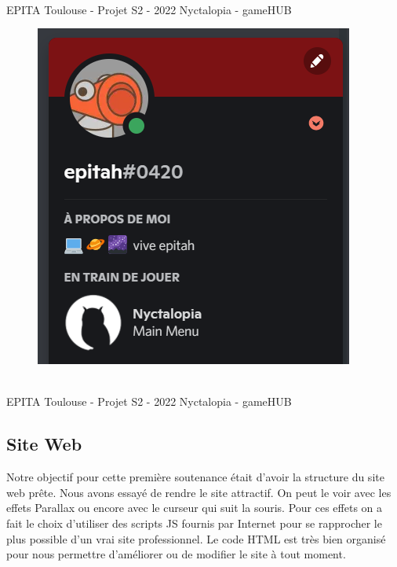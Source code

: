 \vfill
\noindent\makebox[\linewidth]{\rule{.8\paperwidth}{.6pt}}\\[0.2cm]
EPITA Toulouse - Projet S2 - 2022 \hfill Nyctalopia - gameHUB
\noindent\makebox[\linewidth]{\rule{.8\paperwidth}{.6pt}}
\newpage

\begin{figure}[H]
\centering
\begin{minipage}{.5\textwidth}
  \centering
  \centerline{\includegraphics[width=1\linewidth]{img/ui/DRPC.png}}
  \label{fig:drpc}
\end{minipage}%
\end{figure}

\vfill
\noindent\makebox[\linewidth]{\rule{.8\paperwidth}{.6pt}}\\[0.2cm]
EPITA Toulouse - Projet S2 - 2022 \hfill Nyctalopia - gameHUB
\noindent\makebox[\linewidth]{\rule{.8\paperwidth}{.6pt}}
\newpage

\subsection{Site Web}
\setlength{\parindent}{5ex}
Notre objectif pour cette première soutenance était d’avoir la structure du site web prête. Nous avons essayé de rendre le site attractif. On peut le voir avec les effets Parallax ou encore avec le curseur qui suit la souris.
Pour ces effets on a fait le choix d'utiliser des scripts JS fournis par Internet pour se rapprocher le plus possible d'un vrai site professionnel. Le code HTML est très bien organisé pour nous permettre d'améliorer ou de modifier le site à tout moment. 


